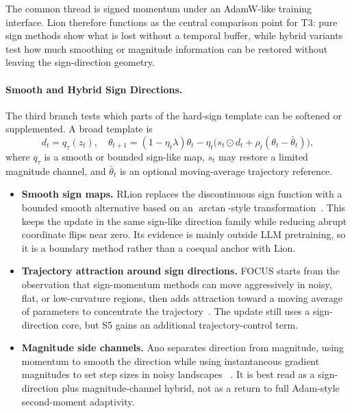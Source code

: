The common thread is signed momentum under an AdamW-like training interface.
Lion therefore functions as the central comparison point for T3: pure sign
methods show what is lost without a temporal buffer, while hybrid variants
test how much smoothing or magnitude information can be restored without
leaving the sign-direction geometry.

\paragraph{Smooth and Hybrid Sign Directions.}
\label{sec:t3-hybrid-sign}

The third branch tests which parts of the hard-sign template can be softened
or supplemented.  A broad template is
\begin{equation}
  d_t=q_\tau(z_t),\quad
  \theta_{t+1}
  =(1-\eta_t\lambda)\theta_t
  -\eta_t\big(s_t\odot d_t+\rho_t(\theta_t-\bar{\theta}_t)\big),
  \label{eq:t3-hybrid-sign-template}
\end{equation}
where $q_\tau$ is a smooth or bounded sign-like map, $s_t$ may restore a
limited magnitude channel, and $\bar{\theta}_t$ is an optional moving-average
trajectory reference.
\begin{itemize}
  \setlength{\itemsep}{2pt}
  \item \textbf{Smooth sign maps.}  RLion replaces the discontinuous sign
  function with a bounded smooth alternative based on an $\arctan$-style
  transformation~\citep{rong2024rlion}.  This keeps the update in the same
  sign-like direction family while reducing abrupt coordinate flips near zero.
  Its evidence is mainly outside LLM pretraining, so it is a boundary method
  rather than a coequal anchor with Lion.
  \item \textbf{Trajectory attraction around sign directions.}  FOCUS starts
  from the observation that sign-momentum methods can move aggressively in
  noisy, flat, or low-curvature regions, then adds attraction toward a moving
  average of parameters to concentrate the trajectory~\citep{liu2025focus}.
  The update still uses a sign-direction core, but S5 gains an additional
  trajectory-control term.
  \item \textbf{Magnitude side channels.}  Ano separates direction from
  magnitude, using momentum to smooth the direction while using instantaneous
  gradient magnitudes to set step sizes in noisy landscapes
  ~\citep{kegreisz2025ano}.  It is best read as a sign-direction plus
  magnitude-channel hybrid, not as a return to full Adam-style second-moment
  adaptivity.
\end{itemize}

